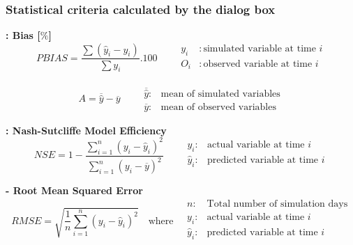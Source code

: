 \subsubsection*{Statistical criteria calculated by the  dialog box}

\textbf{ : Bias [$\%$]}
\begin{equation*}
PBIAS = \frac{\sum(\hat{y}_i -y_i)}{\sum y_i} . 100
\quad \quad
\begin{array}{rl}
      
      y_i & : \text{simulated variable at time $i$}\\
      O_i & : \text{observed variable at time $i$}\\
\end{array}  
\end{equation*}

\textbf{}
\begin{equation*}
    A = \overline{\hat{y}} - \overline{y}
    \quad\quad
    \begin{array}{cc}
         \overline{\hat{y}} :& \text{mean of simulated variables} \\
         \overline{y} : & \text{mean of observed variables}
    \end{array}
\end{equation*}

\textbf{ : Nash-Sutcliffe Model Efficiency} \citep{nash1970}
\begin{equation*}
    NSE = 1 - \frac{\sum_{i=1}^n (y_i - \hat{y}_i)^2}{\sum_{i=1}^n (y_i - \overline{y})^2}
    \quad \quad 
    \begin{array}{ll}
         y_i :& \text{actual variable at time } i \\
        \hat{y}_i :& \text{predicted variable at time } i \\
    \end{array}
\end{equation*}

\textbf{ - Root Mean Squared Error} 
\begin{equation*}
RMSE = \sqrt{\frac{1}{n} \sum_{i=1}^{n} (y_i - \hat{y}_i)^2}
\quad \text{where} \quad
\begin{array}{ll}
    n :& \text{Total number of simulation days} \\
    y_i :& \text{actual variable at time } i \\
    \hat{y}_i :& \text{predicted variable at time } i \\
\end{array}
\end{equation*}

